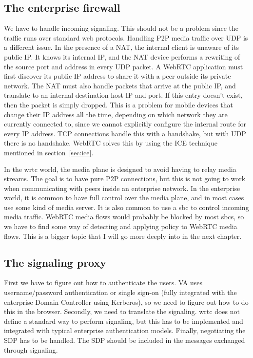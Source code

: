 \subsection{The enterprise firewall}
We have to handle incoming signaling. This should not be a problem since the traffic runs over standard web protocols. Handling P2P media traffic over UDP is a different issue. In the presence of a NAT, the internal client is unaware of its public IP. It knows its internal IP, and the NAT device performs a rewriting of the source port and address in every UDP packet. A WebRTC application must first discover its public IP address to share it with a peer outside its private network. The NAT must also handle packets that arrive at the public IP, and translate to an internal destination host IP and port. If this entry doesn't exist, then the packet is simply dropped. This is a problem for mobile devices that change their IP address all the time, depending on which network they are currently connected to, since we cannot explicitly configure the internal route for every IP address. TCP connections handle this with a handshake, but with UDP there is no handshake. WebRTC solves this by using the ICE technique mentioned in section~\ref{sec:ice}.

In the \gls{wrtc} world, the media plane is designed to avoid having to relay media streams. The goal is to have pure P2P connections, but this is not going to work when communicating with peers inside an enterprise network. In the enterprise world, it is common to have full control over the media plane, and in most cases use some kind of media server. It is also common to use a \gls{sbc} to control incoming media traffic. WebRTC media flows would probably be blocked by most \gls{sbc}s, so we have to find some way of detecting and applying policy to WebRTC media flows. This is a bigger topic that I will go more deeply into in the next chapter.

\subsection{The signaling proxy}
First we have to figure out how to authenticate the users. VA uses username/password authentication or single sign-on (fully integrated with the enterprise Domain Controller using Kerberos), so we need to figure out how to do this in the browser. Secondly, we need to translate the signaling. \gls{wrtc} does not define a standard way to perform signaling, but this has to be implemented and integrated with typical enterprise authentication models. Finally, negotiating the SDP has to be handled. The SDP should be included in the messages exchanged through signaling.
 


